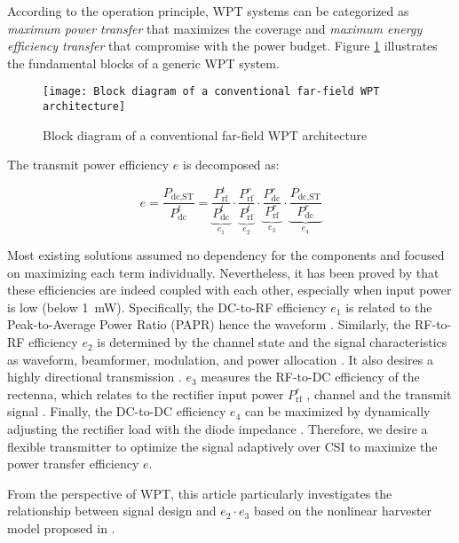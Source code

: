 According to the operation principle, WPT systems can be categorized as \textit{maximum power transfer} that maximizes the coverage and \textit{maximum energy efficiency transfer} \cite{Hui2014} that compromise with the power budget. Figure \ref{fig:wpt-block-diagram} illustrates the fundamental blocks of a generic WPT system.

\begin{figure}
  \centering
    \texttt{[image: Block diagram of a conventional far-field WPT architecture]}
  \caption{Block diagram of a conventional far-field WPT architecture \cite{Clerckx2018a}}
  \label{fig:wpt-block-diagram}
\end{figure}

The transmit power efficiency $e$ is decomposed as:

\begin{equation}\label{eqn:power_utilization_efficiency}
  e = \frac{{{P_{{\text{dc}},{\text{ST}}}}}}{{P_{{\text{dc}}}^t}} = \underbrace {\frac{{P_{{\text{rf}}}^t}}{{P_{{\text{dc}}}^t}}}_{{e_1}} \cdot \underbrace {\frac{{P_{{\text{rf}}}^r}}{{P_{{\text{rf}}}^t}}}_{{e_2}} \cdot \underbrace {\frac{{P_{{\text{dc}}}^r}}{{P_{{\text{rf}}}^r}}}_{{e_3}} \cdot \underbrace {\frac{{{P_{{\text{dc}},{\text{ST}}}}}}{{P_{{\text{dc}}}^r}}}_{{e_4}}
\end{equation}

Most existing solutions assumed no dependency for the components and focused on maximizing each term individually. Nevertheless, it has been proved by \cite{Boshkovska2015, Clerckx2016, Zeng2017} that these efficiencies are indeed coupled with each other, especially when input power is low (below 1~mW). Specifically, the DC-to-RF efficiency ${e_1}$ is related to the Peak-to-Average Power Ratio (PAPR) hence the waveform \cite{Boaventura2011}. Similarly, the RF-to-RF efficiency ${e_2}$ is determined by the channel state and the signal characteristics as waveform, beamformer, modulation, and power allocation \cite{Clerckx2019}. It also desires a highly directional transmission \cite{Takahashi2011}. ${e_3}$ measures the RF-to-DC efficiency of the rectenna, which relates to the rectifier input power ${P_{{\text{rf}}}^r}$ \cite{Trotter2009, Chen2017, Clerckx2018a}, channel and the transmit signal \cite{Collado2014, Boaventura2015, Clerckx2019}. Finally, the DC-to-DC efficiency ${e_4}$ can be maximized by dynamically adjusting the rectifier load with the diode impedance \cite{Dolgov2010}. Therefore, we desire a flexible transmitter to optimize the signal adaptively over CSI to maximize the power transfer efficiency $e$.

From the perspective of WPT, this article particularly investigates the relationship between signal design and ${e_2} \cdot {e_3}$ based on the nonlinear harvester model proposed in \cite{Clerckx2016}.
